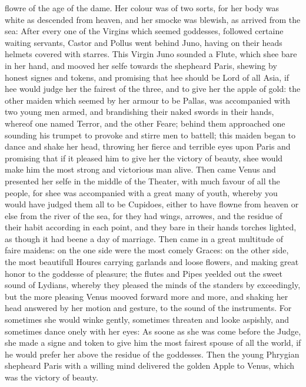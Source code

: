 flowre of the age of the dame. Her colour was of two sorts, for her body was
white as descended from heaven, and her smocke was blewish, as arrived from the
sea: After every one of the Virgins which seemed goddesses, followed certaine
waiting servants, Castor and Pollus went behind Juno, having on their heads
helmets covered with starres. This Virgin Juno sounded a Flute, which shee bare
in her hand, and mooved her selfe towards the shepheard Paris, shewing by
honest signes and tokens, and promising that hee should be Lord of all Asia, if
hee would judge her the fairest of the three, and to give her the apple of
gold: the other maiden which seemed by her armour to be Pallas, was accompanied
with two young men armed, and brandishing their naked swords in their hands,
whereof one named Terror, and the other Feare; behind them approached one
sounding his trumpet to provoke and stirre men to battell; this maiden began to
dance and shake her head, throwing her fierce and terrible eyes upon Paris and
promising that if it pleased him to give her the victory of beauty, shee would
make him the most strong and victorious man alive. Then came Venus and
presented her selfe in the middle of the Theater, with much favour of all the
people, for shee was accompanied with a great many of youth, whereby you would
have judged them all to be Cupidoes, either to have flowne from heaven or else
from the river of the sea, for they had wings, arrowes, and the residue of
their habit according in each point, and they bare in their hands torches
lighted, as though it had beene a day of marriage. Then came in a great
multitude of faire maidens: on the one side were the most comely Graces: on the
other side, the most beautifull Houres carrying garlands and loose flowers, and
making great honor to the goddesse of pleasure; the flutes and Pipes yeelded
out the sweet sound of Lydians, whereby they pleased the minds of the standers
by exceedingly, but the more pleasing Venus mooved forward more and more, and
shaking her head answered by her motion and gesture, to the sound of the
instruments. For sometimes she would winke gently, sometimes threaten and looke
aspishly, and sometimes dance onely with her eyes: As soone as she was come
before the Judge, she made a signe and token to give him the most fairest
spouse of all the world, if he would prefer her above the residue of the
goddesses. Then the young Phrygian shepheard Paris with a willing mind
delivered the golden Apple to Venus, which was the victory of beauty.

